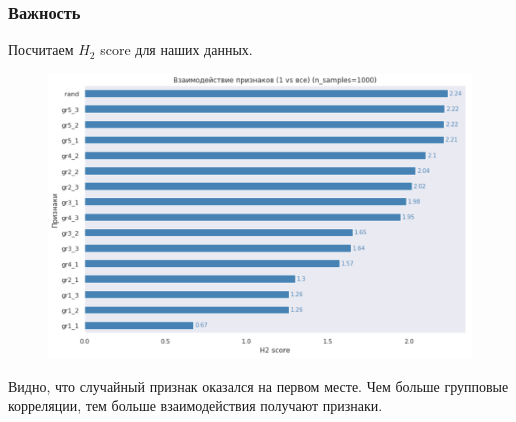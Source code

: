 \documentclass[12pt]{article}
\begin{document}
\subsubsection{Важность}\label{art_imortance}
Посчитаем $H_2$ score для наших данных.
\begin{figure}[h]
\centering
\includegraphics[width=150mm]{images/h2_art.png}
\end{figure}

Видно, что случайный признак оказался на первом месте. Чем больше групповые корреляции, тем больше взаимодействия получают признаки. 
\end{document}
